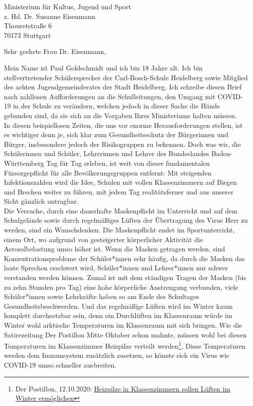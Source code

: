 \documentclass[
	fontsize=12pt,
	parskip=full,
	paper=A4,	
	fromalign=right,
	fromemail=true,
	version=last,
]{scrlttr2}
\begin{document}
\begin{letter}{
	Ministerium für Kultus, Jugend und Sport\\
	z. Hd. Dr. Susanne Eisenmann\\
	Thouretstraße 6\\
	70173 Stuttgart 
}
	
\opening{Sehr geehrte Frau Dr. Eisenmann,}

Mein Name ist Paul Goldschmidt und ich bin 18 Jahre alt. Ich bin stellvertretender Schülersprecher der Carl-Bosch-Schule Heidelberg sowie Mitglied des achten Jugendgemeinderates der Stadt Heidelberg. Ich schreibe diesen Brief nach zahllosen Aufforderungen an die Schulleitungen, den Umgang mit COVID-19 in der Schule zu verändern, welchen jedoch in dieser Sache die Hände gebunden sind, da sie sich an die Vorgaben Ihres Ministeriums halten müssen.\\
In diesen beispiellosen Zeiten, die uns vor enorme Herausforderungen stellen, ist es wichtiger denn je, sich klar zum Gesundheitsschutz der Bürgerinnen und Bürger, insbesondere jedoch der Risikogruppen zu bekennen. Doch was wir, die Schülerinnen und Schüler, Lehrerinnen und Lehrer des Bundeslandes Baden-Württemberg Tag für Tag erleben, ist weit von dieser fundamentalen Fürsorgepflicht für alle Bevölkerungsgruppen entfernt: Mit steigenden Infektionszahlen wird die Idee, Schulen mit vollen Klassenzimmern auf Biegen und Brechen weiter zu führen, mit jedem Tag realitätsferner und aus unserer Sicht gänzlich untragbar. \\
Die Versuche, durch eine dauerhafte Maskenpflicht im Unterricht und auf dem Schulgelände sowie durch regelmäßiges Lüften der Übertragung des Virus Herr zu werden, sind ein Wunschdenken. Die Maskenpflicht endet im Sportunterricht, einem Ort, wo aufgrund von gesteigerter körperlicher Aktivität die Aerosolbelastung umso höher ist. Wenn die Masken getragen werden, sind Konzentrationsprobleme der Schüler*innen sehr häufig, da durch die Masken das laute Sprechen erschwert wird, Schüler*innen und Lehrer*innen nur schwer verstanden werden können. Zumal ist mit dem ständigen Tragen der Masken (bis zu zehn Stunden pro Tag) eine hohe körperliche Anstrengung verbunden, viele Schüler*innen sowie Lehrkräfte haben so am Ende des Schultages Gesundheitsbeschwerden. Und das regelmäßige Lüften wird im Winter kaum komplett durchsetzbar sein, denn ein Durchlüften im Klassenraum würde im Winter wohl arktische Temperaturen im Klassenraum mit sich bringen. Wie die Satirezeitung \glqq Der Postillon\grqq{} Mitte Oktober schon mahnte, müssen wohl bei diesen Temperaturen im Klassenzimmer Heizpilze verteilt werden\footnote{Der Postillon, 12.10.2020: \glqq \href{https://www.der-postillon.com/2020/10/heizpilze.html}{\color{blue}Heizpilze in Klassenzimmern sollen Lüften im Winter ermöglichen\grqq}}. Diese Temperaturen werden dem Immunsystem zusätzlich zusetzen, so könnte sich ein Virus wie COVID-19 umso schneller ausbreiten. \\


\end{letter}
\end{document}
